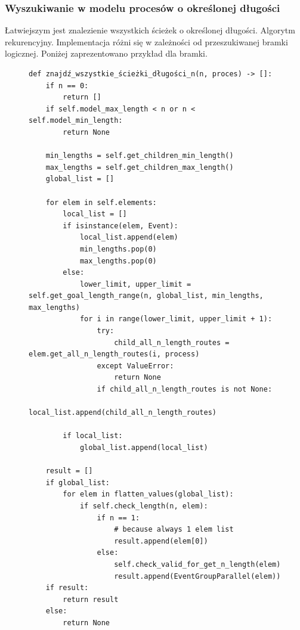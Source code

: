 \clearpage
\subsubsection{Wyszukiwanie w modelu procesów o określonej długości}

Łatwiejszym jest znalezienie wszystkich ścieżek o określonej długości. 
Algorytm rekurencyjny. Implementacja różni się w zależności od przeszukiwanej bramki logicznej. Poniżej zaprezentowano przykład dla bramki.  
\begin{figure}[!ht]
\lstset{caption=Wyszukiwanie procesów o długości n, captionpos=b}
\lstset{label=src:get_n_length, frame=single}
\begin{lstlisting}
def znajdź_wszystkie_ścieżki_długości_n(n, proces) -> []:
    if n == 0:
        return []
    if self.model_max_length < n or n < self.model_min_length:
        return None

    min_lengths = self.get_children_min_length()
    max_lengths = self.get_children_max_length()
    global_list = []

    for elem in self.elements:
        local_list = []
        if isinstance(elem, Event):
            local_list.append(elem)
            min_lengths.pop(0)
            max_lengths.pop(0)
        else:
            lower_limit, upper_limit = self.get_goal_length_range(n, global_list, min_lengths, max_lengths)
            for i in range(lower_limit, upper_limit + 1):
                try:
                    child_all_n_length_routes = elem.get_all_n_length_routes(i, process)
                except ValueError:
                    return None
                if child_all_n_length_routes is not None:
                    local_list.append(child_all_n_length_routes)

        if local_list:
            global_list.append(local_list)

    result = []
    if global_list:
        for elem in flatten_values(global_list):
            if self.check_length(n, elem):
                if n == 1:
                    # because always 1 elem list
                    result.append(elem[0])
                else:
                    self.check_valid_for_get_n_length(elem)
                    result.append(EventGroupParallel(elem))
    if result:
        return result
    else:
        return None
\end{lstlisting}
\end{figure}

\clearpage
